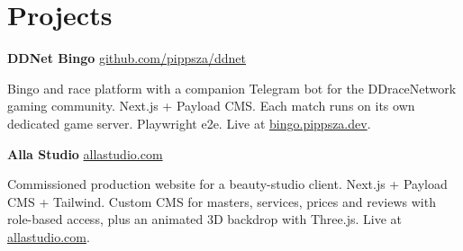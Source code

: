\documentclass[11pt,a4paper]{article}
\newcommand{\sidebarwidth}{5.8cm}
\begin{document}
\begin{minipage}[t]{\dimexpr\paperwidth-\sidebarwidth\relax}
\begin{minipage}[t]{\dimexpr\paperwidth-\sidebarwidth-1.8cm\relax}
\section*{Projects}

{\bfseries DDNet Bingo} \quad \href{https://github.com/pippsza/ddnet}{\color{accent}\small github.com/pippsza/ddnet}\par
\vspace{2pt}
Bingo and race platform with a companion Telegram bot for the DDraceNetwork
gaming community. Next.js + Payload CMS. Each match runs on its own
dedicated game server. Playwright e2e. Live at
\href{https://bingo.pippsza.dev}{bingo.pippsza.dev}.

\vspace{6pt}
{\bfseries Alla Studio} \quad \href{https://allastudio.com}{\color{accent}\small allastudio.com}\par
\vspace{2pt}
Commissioned production website for a beauty-studio client. Next.js + Payload
CMS + Tailwind. Custom CMS for masters, services, prices and reviews with
role-based access, plus an animated 3D backdrop with Three.js. Live at
\href{https://allastudio.com}{allastudio.com}.

\end{minipage}
\end{minipage}
\end{document}
